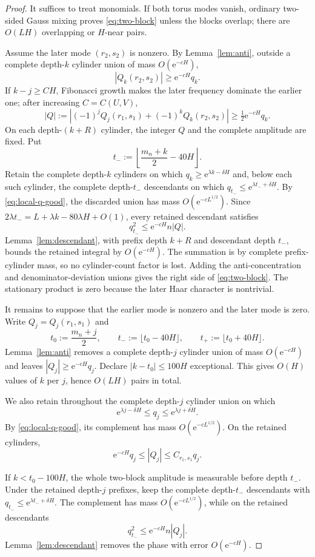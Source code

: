 \documentclass[11pt,a4paper]{amsart}
\theoremstyle{definition}
\theoremstyle{remark}
\newcommand{\e}{\mathrm e}
\begin{document}
\begin{proof}
It suffices to treat monomials.  If both torus modes vanish, ordinary
two-sided Gauss mixing proves \eqref{eq:two-block} unless the blocks overlap;
there are $O(LH)$ overlapping or $H$-near pairs.

Assume the later mode $(r_2,s_2)$ is nonzero.  By
Lemma~\ref{lem:anti}, outside a complete depth-$k$ cylinder union of mass
$O(\e^{-cH})$,
\[
 |Q_k(r_2,s_2)|\ge \e^{-cH}q_k.
\]
If $k-j\ge CH$, Fibonacci growth makes the later frequency dominate the
earlier one; after increasing $C=C(U,V)$,
\[
 |Q|:=|(-1)^jQ_j(r_1,s_1)+(-1)^kQ_k(r_2,s_2)|
 \ge\tfrac12\e^{-cH}q_k.
\]
On each depth-$(k+R)$ cylinder, the integer $Q$ and the complete amplitude
are fixed.  Put
\[
 t_-:=\left\lfloor\frac{m_n+k}{2}-40H\right\rfloor.
\]
Retain the complete depth-$k$ cylinders on which
$q_k\ge \e^{\lambda k-\delta H}$ and, below each such cylinder, the complete
depth-$t_-$ descendants on which
$q_{t_-}\le \e^{\lambda t_-+\delta H}$.  By
\eqref{eq:local-q-good}, the discarded union has mass
$O(\e^{-cL^{1/2}})$.  Since
$2\lambda t_-=L+\lambda k-80\lambda H+O(1)$, every retained descendant
satisfies
\[
 q_{t_-}^2\le \e^{-cH}n|Q|.
\]
Lemma~\ref{lem:descendant}, with prefix depth $k+R$ and descendant depth
$t_-$, bounds the retained integral by $O(\e^{-cH})$.  The summation is by
complete prefix-cylinder mass, so no cylinder-count factor is lost.  Adding
the anti-concentration and denominator-deviation unions gives the right side
of \eqref{eq:two-block}.  The stationary product is zero because the later
Haar character is nontrivial.

It remains to suppose that the earlier mode is nonzero and the later mode is
zero.  Write $Q_j=Q_j(r_1,s_1)$ and
\[
 t_0:=\frac{m_n+j}{2},\qquad
 t_-:=\lfloor t_0-40H\rfloor,
 \qquad t_+:=\lfloor t_0+40H\rfloor.
\]
Lemma~\ref{lem:anti} removes a complete depth-$j$ cylinder union of mass
$O(\e^{-cH})$ and leaves $|Q_j|\ge\e^{-cH}q_j$.  Declare
$|k-t_0|\le100H$ exceptional.  This gives $O(H)$ values of $k$ per $j$,
hence $O(LH)$ pairs in total.

We also retain throughout the complete depth-$j$ cylinder union on which
\[
 \e^{\lambda j-\delta H}\le q_j\le\e^{\lambda j+\delta H}.
\]
By \eqref{eq:local-q-good}, its complement has mass
$O(\e^{-cL^{1/2}})$.  On the retained cylinders,
\[
 \e^{-cH}q_j\le |Q_j|\le C_{r_1,s_1}q_j.
\]

If $k<t_0-100H$, the whole two-block amplitude is measurable before depth
$t_-$.  Under the retained depth-$j$ prefixes, keep the complete
depth-$t_-$ descendants with $q_{t_-}\le\e^{\lambda t_-+\delta H}$.
The complement has mass
$O(\e^{-cL^{1/2}})$, while on the retained descendants
\[
 q_{t_-}^2\le\e^{-cH}n|Q_j|.
\]
Lemma~\ref{lem:descendant} removes the phase with error $O(\e^{-cH})$.


\end{proof}
\end{document}
